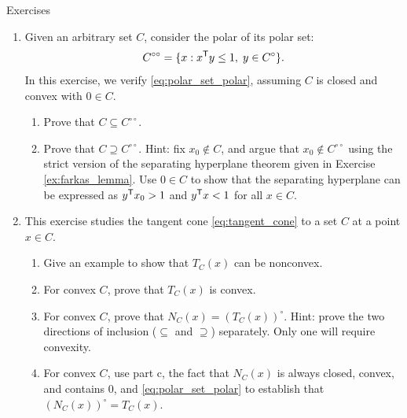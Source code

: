\begin{xcb}{Exercises}
\begin{enumerate}[label=\thechapter.\arabic*]
\item \label{ex:polar_set_polar}
  Given an arbitrary set $C$, consider the polar of its polar set:
  \[
  C^{\circ\circ} = \{ x : x^{\mathsf{T}} y \leq 1, \; y \in C^\circ \}.
  \]
  In this exercise, we verify \eqref{eq:polar_set_polar}, assuming $C$ is closed
  and convex with $0 \in C$.
  
\begin{enumerate}[label=\alph*.] 
\item Prove that $C \subseteq C^{\circ\circ}$.
\item Prove that $C \supseteq C^{\circ\circ}$. Hint: fix $x_0 \notin C$, and
  argue that $x_0 \notin C^{\circ\circ}$ using the strict version of the
  separating hyperplane theorem given in Exercise \ref{ex:farkas_lemma}. Use $0
  \in C$ to show that the separating hyperplane can be expressed as $y^{\mathsf{T}} x_0 >
  1$ and $y^{\mathsf{T}} x < 1$ for all $x \in C$.
\end{enumerate}

\item \label{ex:tangent_cone}
  This exercise studies the tangent cone \eqref{eq:tangent_cone} to a set $C$ at
  a point $x \in C$. 

\begin{enumerate}[label=\alph*.] 
\item Give an example to show that $T_C(x)$ can be nonconvex.
\item For convex $C$, prove that $T_C(x)$ is convex. 
\item For convex $C$, prove that $N_C(x) = (T_C(x))^\circ$. Hint: prove the two  
  directions of inclusion ($\subseteq$ and $\supseteq$) separately. Only one 
  will require convexity.     
\item For convex $C$, use part c, the fact that $N_C(x)$ is always closed,
  convex, and contains 0, and \eqref{eq:polar_set_polar} to establish that
  $(N_C(x))^\circ = T_C(x)$.     
\end{enumerate}


\end{enumerate}
\end{xcb}
